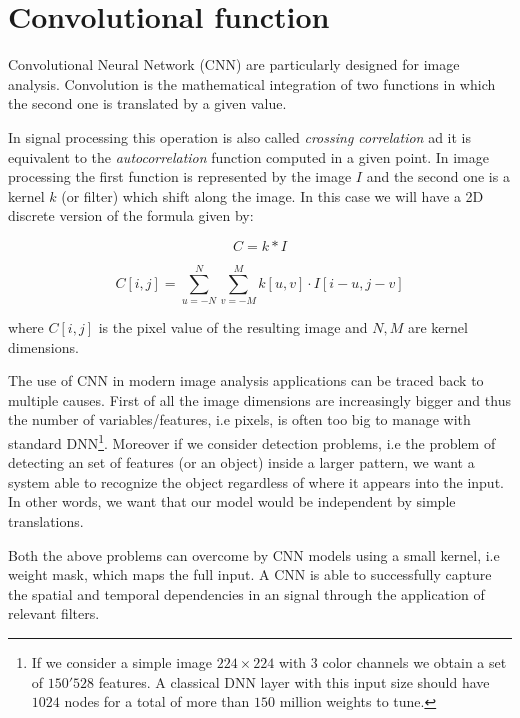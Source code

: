 \documentclass{standalone}
\begin{document}

\section[Convolutional function]{Convolutional function}\label{convolutional}

Convolutional Neural Network (CNN) are particularly designed for image analysis.
Convolution is the mathematical integration of two functions in which the second one is translated by a given value.

In signal processing this operation is also called \emph{crossing correlation} ad it is equivalent to the \emph{autocorrelation} function computed in a given point.
In image processing the first function is represented by the image $I$ and the second one is a kernel $k$ (or filter) which shift along the image.
In this case we will have a 2D discrete version of the formula given by:

$$
C = k * I
$$

$$
C[i, j] = \sum_{u=-N}^{N} \sum_{v=-M}^{M} k[u, v] \cdot I[i - u, j - v]
$$

where $C[i, j]$ is the pixel value of the resulting image and $N, M$ are kernel dimensions.

The use of CNN in modern image analysis applications can be traced back to multiple causes.
First of all the image dimensions are increasingly bigger and thus the number of variables/features, i.e pixels, is often too big to manage with standard DNN\footnote{
  If we consider a simple image $224\times224$ with $3$ color channels we obtain a set of $150'528$ features.
  A classical DNN layer with this input size should have $1024$ nodes for a total of more than $150$ million weights to tune.
}.
Moreover if we consider detection problems, i.e the problem of detecting an set of features (or an object) inside a larger pattern, we want a system able to recognize the object regardless of where it appears into the input.
In other words, we want that our model would be independent by simple translations.

Both the above problems can overcome by CNN models using a small kernel, i.e weight mask, which maps the full input.
A CNN is able to successfully capture the spatial and temporal dependencies in an signal through the application of relevant filters.


\end{document}
